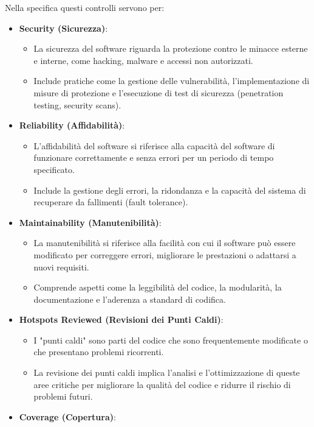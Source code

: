 Nella specifica questi controlli servono per:
\begin{itemize}
    \item \textbf{Security (Sicurezza)}:
    \begin{itemize}
        \item La sicurezza del software riguarda la protezione contro le minacce esterne e interne, come hacking, malware e accessi non autorizzati.
        \item Include pratiche come la gestione delle vulnerabilità, l'implementazione di misure di protezione e l'esecuzione di test di sicurezza (penetration testing, security scans).
    \end{itemize}
    \item \textbf{Reliability (Affidabilità)}:
    \begin{itemize}
        \item L'affidabilità del software si riferisce alla capacità del software di funzionare correttamente e senza errori per un periodo di tempo specificato.
        \item Include la gestione degli errori, la ridondanza e la capacità del sistema di recuperare da fallimenti (fault tolerance).
    \end{itemize}
    \item \textbf{Maintainability (Manutenibilità)}:
    \begin{itemize}
        \item La manutenibilità si riferisce alla facilità con cui il software può essere modificato per correggere errori, migliorare le prestazioni o adattarsi a nuovi requisiti.
        \item Comprende aspetti come la leggibilità del codice, la modularità, la documentazione e l'aderenza a standard di codifica.
    \end{itemize}
    \item \textbf{Hotspots Reviewed (Revisioni dei Punti Caldi)}:
    \begin{itemize}
        \item I "punti caldi" sono parti del codice che sono frequentemente modificate o che presentano problemi ricorrenti.
        \item La revisione dei punti caldi implica l'analisi e l'ottimizzazione di queste aree critiche per migliorare la qualità del codice e ridurre il rischio di problemi futuri.
    \end{itemize}
    \item \textbf{Coverage (Copertura)}:
    \begin{itemize}

\end{itemize}
\end{itemize}
